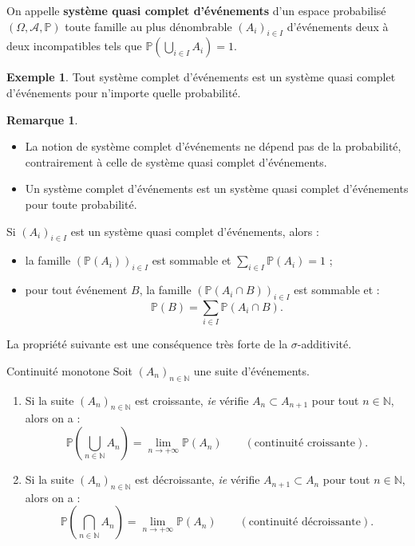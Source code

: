 \documentclass[french]{article}
\renewcommand{\P}{\mathbb{P}}
\newcommand{\N}{\mathbb{N}}
\theoremstyle{plain}
\theoremstyle{definition}
\newtheorem*{ex}{Exemple}
\newtheorem*{rmq}{Remarque}
\theoremstyle{remark}
\begin{document}
\begin{dfn}
	On appelle \textbf{système quasi complet d'événements} d'un espace probabilisé $(\Omega,\mathcal{A},\P)$ toute famille au plus dénombrable $(A_i)_{i\in I}$ d'événements deux à deux incompatibles tels que $\P\displaystyle\left(\bigcup_{i\in I}A_i\right)=1$.
\end{dfn}

\begin{ex}
	Tout système complet d'événements est un système quasi complet d'événements pour n'importe quelle probabilité.
\end{ex}

\begin{rmq}
	\begin{itemize}
		\item La notion de système complet d'événements ne dépend pas de la probabilité, contrairement à celle de système quasi complet d'événements.
		\item Un système complet d'événements est un système quasi complet d'événements pour toute probabilité.
	\end{itemize}
\end{rmq}

\begin{thm}{}%
	Si $(A_i)_{i\in I}$ est un système quasi complet d'événements, alors :
	\begin{itemize}
		\item la famille $(\P(A_i))_{i\in I}$ est sommable et $\displaystyle\sum_{i\in I}\P(A_i)=1$ ;
		\item pour tout événement $B$, la famille $(\P(A_i\cap B))_{i\in I}$ est sommable et : $$\P(B)=\sum_{i\in I}\P(A_i\cap B).$$
	\end{itemize}
\end{thm}

La propriété suivante est une conséquence très forte de la $\sigma$-additivité.

\begin{thm}{Continuité monotone}%
	Soit $(A_n)_{n\in\N}$ une suite d'événements.
	\begin{enumerate}
		\item Si la suite $(A_n)_{n\in\N}$ est croissante, \textit{ie} vérifie $A_n\subset A_{n+1}$ pour tout $n\in\N$, alors on a : $$\P\left(\bigcup_{n\in\N}A_n\right)=\underset{n\to+\infty}{\lim}\P(A_n)\quad\quad(\text{continuité croissante}).$$
		\item Si la suite $(A_n)_{n\in\N}$ est décroissante, \textit{ie} vérifie $A_{n+1}\subset A_{n}$ pour tout $n\in\N$, alors on a : $$\P\left(\bigcap_{n\in\N}A_n\right)=\underset{n\to+\infty}{\lim}\P(A_n)\quad\quad(\text{continuité décroissante}).$$
	\end{enumerate}
\end{thm}
\end{document}
